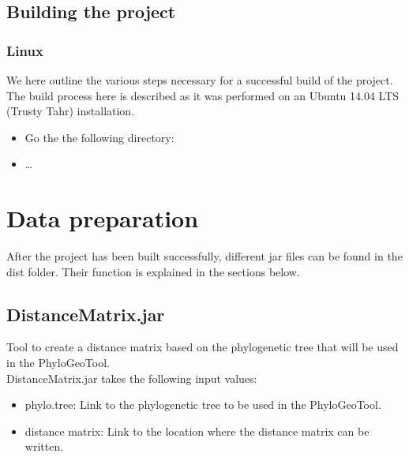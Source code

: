 \documentclass[a4paper, 11pt]{article} %
\begin{document}
\subsection{Building the project}

\subsubsection{Linux}

We here outline the various steps necessary for a successful build of the project.
The build process here is described as it was performed on an Ubuntu 14.04 LTS (Trusty Tahr) installation.
\begin{itemize}
\item Go the the following directory:
\item \ldots
\end{itemize}

\section{Data preparation}
After the project has been built successfully, different jar files can be found in the dist folder. 
Their function is explained in the sections below.

\subsection{DistanceMatrix.jar}
Tool to create a distance matrix based on the phylogenetic tree that will be used in the PhyloGeoTool.
\\
DistanceMatrix.jar takes the following input values:
\begin{itemize}
\item phylo.tree: Link to the phylogenetic tree to be used in the PhyloGeoTool.
\item distance matrix: Link to the location where the distance matrix can be written.
\end{itemize}
\end{document}
